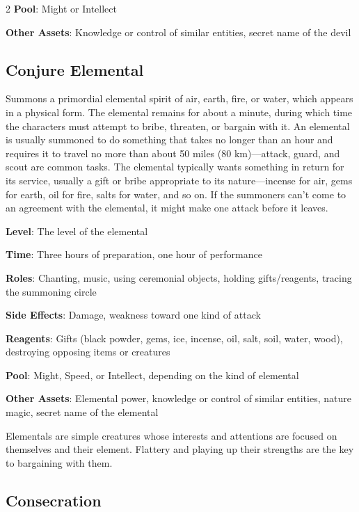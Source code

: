 \begin{multicols}{2}
\textbf{Pool}: Might or Intellect 

\textbf{Other Assets}: Knowledge or control of similar entities, secret name of the devil 

\subsection{Conjure Elemental}

Summons a primordial elemental spirit of air, earth, fire, or water, which appears in a physical form. The elemental remains for about a minute, during which time the characters must attempt to bribe, threaten, or bargain with it. An elemental is usually summoned to do something that takes no longer than an hour and requires it to travel no more than about 50 miles (80 km)—attack, guard, and scout are common tasks. The elemental typically wants something in return for its service, usually a gift or bribe appropriate to its nature—incense for air, gems for earth, oil for fire, salts for water, and so on. If the summoners can’t come to an agreement with the elemental, it might make one attack before it leaves. 

\textbf{Level}: The level of the elemental 

\textbf{Time}: Three hours of preparation, one hour of performance 

\textbf{Roles}: Chanting, music, using ceremonial objects, holding gifts/reagents, tracing the summoning circle 

\textbf{Side Effects}: Damage, weakness toward one kind of attack 

\textbf{Reagents}: Gifts (black powder, gems, ice, incense, oil, salt, soil, water, wood), destroying opposing items or creatures 

\textbf{Pool}: Might, Speed, or Intellect, depending on the kind of elemental 

\textbf{Other Assets}: Elemental power, knowledge or control of similar entities, nature magic, secret name of the elemental

Elementals are simple creatures whose interests and attentions are focused on themselves and their element. Flattery and playing up their strengths are the key to bargaining with them.

\subsection{Consecration}


\end{multicols}
